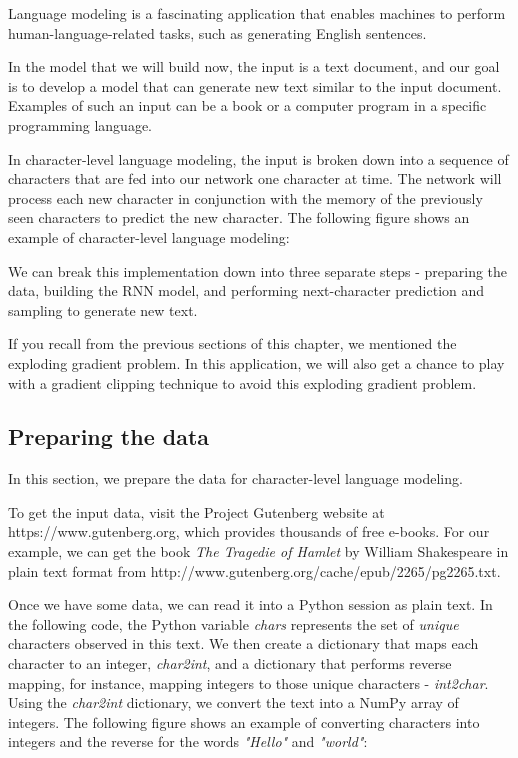 \documentclass[11pt]{article}
\begin{document}
    Language modeling is a fascinating application that enables machines to
perform human-language-related tasks, such as generating English
sentences.

In the model that we will build now, the input is a text document, and
our goal is to develop a model that can generate new text similar to the
input document. Examples of such an input can be a book or a computer
program in a specific programming language.

In character-level language modeling, the input is broken down into a
sequence of characters that are fed into our network one character at
time. The network will process each new character in conjunction with
the memory of the previously seen characters to predict the new
character. The following figure shows an example of character-level
language modeling:

    We can break this implementation down into three separate steps -
preparing the data, building the RNN model, and performing
next-character prediction and sampling to generate new text.

If you recall from the previous sections of this chapter, we mentioned
the exploding gradient problem. In this application, we will also get a
chance to play with a gradient clipping technique to avoid this
exploding gradient problem.

    \subsection{Preparing the data}\label{preparing-the-data}

    In this section, we prepare the data for character-level language
modeling.

To get the input data, visit the Project Gutenberg website at
https://www.gutenberg.org, which provides thousands of free e-books. For
our example, we can get the book \emph{The Tragedie of Hamlet} by
William Shakespeare in plain text format from
http://www.gutenberg.org/cache/epub/2265/pg2265.txt.

Once we have some data, we can read it into a Python session as plain
text. In the following code, the Python variable \emph{chars} represents
the set of \emph{unique} characters observed in this text. We then
create a dictionary that maps each character to an integer,
\emph{char2int}, and a dictionary that performs reverse mapping, for
instance, mapping integers to those unique characters - \emph{int2char}.
Using the \emph{char2int} dictionary, we convert the text into a NumPy
array of integers. The following figure shows an example of converting
characters into integers and the reverse for the words \emph{"Hello"}
and \emph{"world"}:
\end{document}

